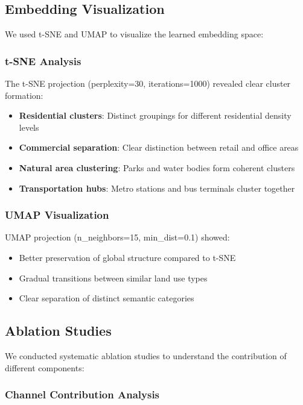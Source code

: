 \subsection{Embedding Visualization}

We used t-SNE and UMAP to visualize the learned embedding space:

\subsubsection{t-SNE Analysis}

The t-SNE projection (perplexity=30, iterations=1000) revealed clear cluster formation:
\begin{itemize}
    \item \textbf{Residential clusters}: Distinct groupings for different residential density levels
    \item \textbf{Commercial separation}: Clear distinction between retail and office areas
    \item \textbf{Natural area clustering}: Parks and water bodies form coherent clusters
    \item \textbf{Transportation hubs}: Metro stations and bus terminals cluster together
\end{itemize}

\subsubsection{UMAP Visualization}

UMAP projection (n\_neighbors=15, min\_dist=0.1) showed:
\begin{itemize}
    \item Better preservation of global structure compared to t-SNE
    \item Gradual transitions between similar land use types
    \item Clear separation of distinct semantic categories
\end{itemize}

\subsection{Ablation Studies}

We conducted systematic ablation studies to understand the contribution of different components:

\subsubsection{Channel Contribution Analysis}

